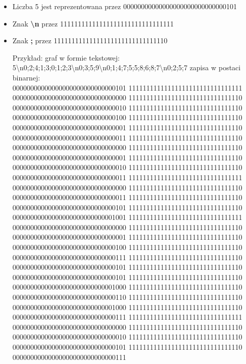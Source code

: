 \documentclass{article}
\begin{document}
\begin{itemize}
  \item Liczba 5 jest reprezentowana przez 00000000000000000000000000000101
  \item Znak \textbf{\textbackslash n} przez 11111111111111111111111111111111
  \item Znak \textbf{;} przez 11111111111111111111111111111110

  Przykład:
  graf w formie tekstowej: 5\textbackslash n0;2;4;1;3;0;1;2;3\textbackslash n0;3;5;9\textbackslash n0;1;4;7;5;5;8;6;8;7\textbackslash n0;2;5;7
  zapisa w postaci binarnej:\\
  00000000000000000000000000000101
  11111111111111111111111111111111
  00000000000000000000000000000000
  11111111111111111111111111111110
  00000000000000000000000000000010
  11111111111111111111111111111110
  00000000000000000000000000000100
  11111111111111111111111111111110
  00000000000000000000000000000001
  11111111111111111111111111111110
  00000000000000000000000000000011
  11111111111111111111111111111110
  00000000000000000000000000000000
  11111111111111111111111111111110
  00000000000000000000000000000001
  11111111111111111111111111111110
  00000000000000000000000000000010
  11111111111111111111111111111110
  00000000000000000000000000000011
  11111111111111111111111111111111
  00000000000000000000000000000000
  11111111111111111111111111111110
  00000000000000000000000000000011
  11111111111111111111111111111110
  00000000000000000000000000000101
  11111111111111111111111111111110
  00000000000000000000000000001001
  11111111111111111111111111111111
  00000000000000000000000000000000
  11111111111111111111111111111110
  00000000000000000000000000000001
  11111111111111111111111111111110
  00000000000000000000000000000100
  11111111111111111111111111111110
  00000000000000000000000000000111
  11111111111111111111111111111110
  00000000000000000000000000000101
  11111111111111111111111111111110
  00000000000000000000000000000101
  11111111111111111111111111111110
  00000000000000000000000000001000
  11111111111111111111111111111110
  00000000000000000000000000000110
  11111111111111111111111111111110
  00000000000000000000000000001000
  11111111111111111111111111111110
  00000000000000000000000000000111
  11111111111111111111111111111111
  00000000000000000000000000000000
  11111111111111111111111111111110
  00000000000000000000000000000010
  11111111111111111111111111111110
  00000000000000000000000000000101
  11111111111111111111111111111110
  00000000000000000000000000000111
\end{itemize}
\end{document}
